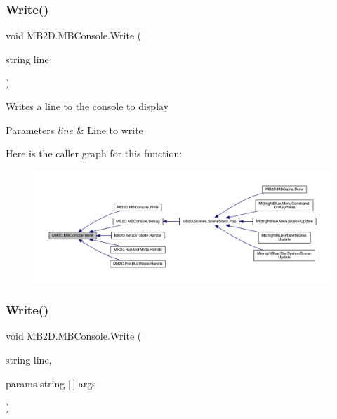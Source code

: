 \subsubsection{\texorpdfstring{Write()}{Write()}\hspace{0.1cm}{\footnotesize\ttfamily [1/3]}}
{\footnotesize\ttfamily void M\+B2\+D.\+M\+B\+Console.\+Write (\begin{DoxyParamCaption}\item[{string}]{line }\end{DoxyParamCaption})\hspace{0.3cm}{\ttfamily [inline]}}



Writes a line to the console to display 


\begin{DoxyParams}{Parameters}
{\em line} & Line to write\\
\hline
\end{DoxyParams}
Here is the caller graph for this function\+:
\nopagebreak
\begin{figure}[H]
\begin{center}
\leavevmode
\includegraphics[width=350pt]{class_m_b2_d_1_1_m_b_console_a1d85081cb5400f09883c1fc62f37d861_icgraph}
\end{center}
\end{figure}
\hypertarget{class_m_b2_d_1_1_m_b_console_a77bc48284eeebbc13eeced6451513c09}{}\label{class_m_b2_d_1_1_m_b_console_a77bc48284eeebbc13eeced6451513c09} 
\subsubsection{\texorpdfstring{Write()}{Write()}\hspace{0.1cm}{\footnotesize\ttfamily [2/3]}}
{\footnotesize\ttfamily void M\+B2\+D.\+M\+B\+Console.\+Write (\begin{DoxyParamCaption}\item[{string}]{line,  }\item[{params string \mbox{[}$\,$\mbox{]}}]{args }\end{DoxyParamCaption})\hspace{0.3cm}{\ttfamily [inline]}}



